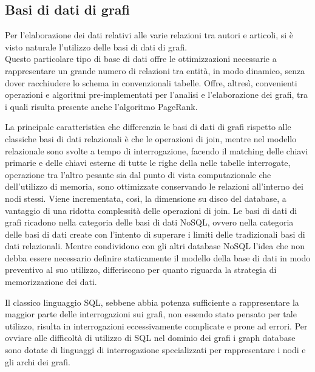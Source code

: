 \documentclass[a4paper, 12pt]{article}
\begin{document}
\subsection{Basi di dati di grafi}
Per l'elaborazione dei dati relativi alle varie relazioni tra autori e articoli, si è visto naturale l'utilizzo delle basi di dati di grafi. \\
Questo particolare tipo di base di dati offre le ottimizzazioni necessarie a rappresentare un grande numero di relazioni tra entità, in modo dinamico, senza dover racchiudere lo schema in convenzionali tabelle. Offre, altresì, convenienti operazioni e algoritmi pre-implementati per l'analisi e l'elaborazione dei grafi, tra i quali risulta presente anche l'algoritmo PageRank.
\par
La principale caratteristica che differenzia le basi di dati di grafi rispetto alle classiche basi di dati relazionali è che le operazioni di join, mentre nel modello relazionale sono svolte a tempo di interrogazione, facendo il matching delle chiavi primarie e delle chiavi esterne di tutte le righe della nelle tabelle interrogate, operazione tra l'altro pesante sia dal punto di vista computazionale che dell'utilizzo di memoria, sono ottimizzate conservando le relazioni all'interno dei nodi stessi. Viene incrementata, così, la dimensione su disco del database, a vantaggio di una ridotta complessità delle operazioni di join.
Le basi di dati di grafi ricadono nella categoria delle basi di dati NoSQL, ovvero nella categoria delle basi di dati create con l'intento di superare i limiti delle tradizionali basi di dati relazionali. Mentre condividono con gli altri database NoSQL l'idea che non debba essere necessario definire staticamente il modello della base di dati in modo preventivo al suo utilizzo, differiscono per quanto riguarda la strategia di memorizzazione dei dati.
\par
Il classico linguaggio SQL, sebbene abbia potenza sufficiente a rappresentare la maggior parte delle interrogazioni sui grafi, non essendo stato pensato per tale utilizzo, risulta in interrogazioni eccessivamente complicate e prone ad errori. Per ovviare alle difficoltà di utilizzo di SQL nel dominio dei grafi i graph database sono dotate di linguaggi di interrogazione specializzati per rappresentare i nodi e gli archi dei grafi.
\end{document}
